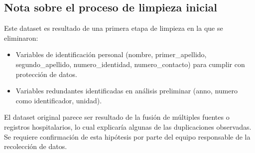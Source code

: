 \documentclass[11pt,a4paper]{article}
\begin{document}
\subsection*{Nota sobre el proceso de limpieza inicial}
Este dataset es resultado de una primera etapa de limpieza en la que se eliminaron:
\begin{itemize}
    \item Variables de identificación personal (nombre, primer\_apellido, segundo\_apellido, numero\_identidad, numero\_contacto) para cumplir con protección de datos.
    \item Variables redundantes identificadas en análisis preliminar (anno, numero como identificador, unidad).
\end{itemize}

El dataset original parece ser resultado de la fusión de múltiples fuentes o registros hospitalarios, lo cual explicaría algunas de las duplicaciones observadas. Se requiere confirmación de esta hipótesis por parte del equipo responsable de la recolección de datos.
\end{document}
